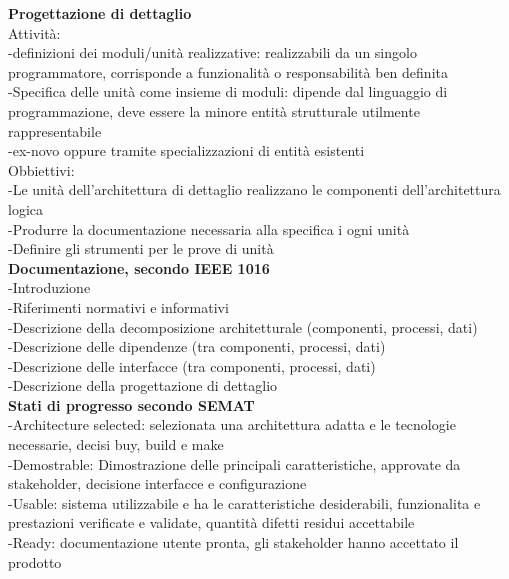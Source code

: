 \documentclass{article}
\begin{document}
		\textbf{Progettazione di dettaglio}\\
		Attività:\\
		-definizioni dei moduli/unità realizzative: realizzabili da un singolo programmatore, corrisponde a funzionalità o responsabilità ben definita\\
		-Specifica delle unità come insieme di moduli: dipende dal linguaggio di programmazione, deve essere la minore entità strutturale utilmente rappresentabile\\
		-ex-novo oppure tramite specializzazioni di entità esistenti\\
		Obbiettivi:\\
		-Le unità dell'architettura di dettaglio realizzano le componenti dell'architettura logica\\
		-Produrre la documentazione necessaria alla specifica i ogni unità\\
		-Definire gli strumenti per le prove di unità\\
		
		\textbf{Documentazione, secondo IEEE 1016}\\
		-Introduzione\\
		-Riferimenti normativi e informativi\\
		-Descrizione della decomposizione architetturale (componenti, processi, dati)\\
		-Descrizione delle dipendenze (tra componenti, processi, dati)\\
		-Descrizione delle interfacce (tra componenti, processi, dati)\\
		-Descrizione della progettazione di dettaglio\\
		
		\textbf{Stati di progresso secondo SEMAT}\\
		-Architecture selected: selezionata una architettura adatta e le tecnologie necessarie, decisi buy, build e make\\
		-Demostrable: Dimostrazione delle principali caratteristiche, approvate da stakeholder, decisione interfacce e configurazione\\
		-Usable: sistema utilizzabile e ha le caratteristiche desiderabili, funzionalita e prestazioni verificate e validate, quantità difetti residui accettabile\\
		-Ready: documentazione utente pronta, gli stakeholder hanno accettato il prodotto
		
		
\end{document}

